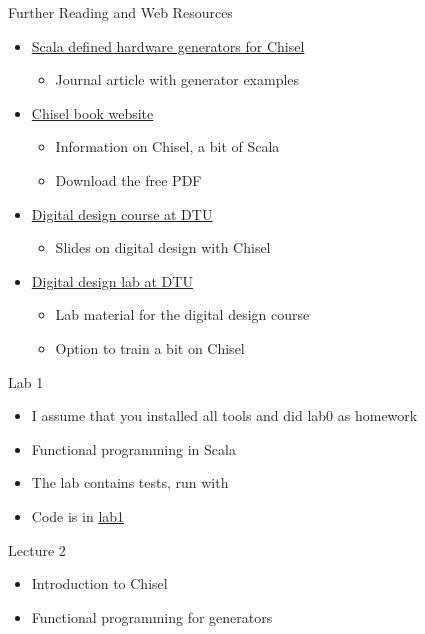 \begin{frame}[fragile]{Further Reading and Web Resources}
\begin{itemize}
\item \href{https://www.sciencedirect.com/science/article/pii/S014193312500050X}{Scala defined hardware generators for Chisel}
\begin{itemize}
\item Journal article with generator examples
\end{itemize}
\item \href{http://www.imm.dtu.dk/~masca/chisel-book.html}{Chisel book website}
\begin{itemize}
\item Information on Chisel, a bit of Scala
\item Download the free PDF
\end{itemize}
\item \href{http://www2.imm.dtu.dk/courses/02139/}{Digital design course at DTU}
\begin{itemize}
\item Slides on digital design with Chisel
\end{itemize}
\item \href{https://github.com/schoeberl/chisel-lab}{Digital design lab at DTU}
\begin{itemize}
\item Lab material for the digital design course
\item Option to train a bit on Chisel
\end{itemize}
\end{itemize}
\end{frame}


\begin{frame}[fragile]{Lab 1}
\begin{itemize}
\item I assume that you installed all tools and did lab0 as homework
\item Functional programming in Scala
\item The lab contains tests, run with 
\item Code is in \href{https://github.com/schoeberl/agile-hw/tree/main/lab1}{lab1}
\end{itemize}
\end{frame}

\begin{frame}[fragile]{Lecture 2}
\begin{itemize}
\item Introduction to Chisel
\item Functional programming for generators
\end{itemize}
\end{frame}

